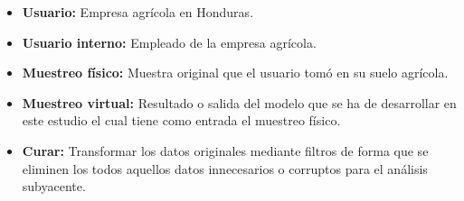 \documentclass{report}
\begin{document}
\begin{itemize}
    \item \textbf{Usuario:} Empresa agrícola en Honduras.
    
    \item \textbf{Usuario interno:} Empleado de la empresa agrícola.
    
    \item \textbf{Muestreo físico:} Muestra original que el usuario tomó en su suelo agrícola.
    
    \item \textbf{Muestreo virtual:} Resultado o salida del modelo que se ha de desarrollar en este estudio el cual tiene como entrada el muestreo físico.
    
    \item \textbf{Curar:} Transformar los datos originales mediante filtros de forma que se eliminen los todos aquellos datos innecesarios o corruptos para el análisis subyacente.
\end{itemize}

\printbibliography
\end{document}
